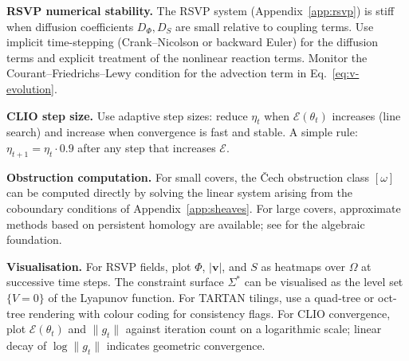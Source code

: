 \documentclass[11pt,openany]{book}
\begin{document}
\textbf{RSVP numerical stability.}  The RSVP system
(Appendix~\ref{app:rsvp}) is stiff when diffusion
coefficients $D_\Phi, D_S$ are small relative to coupling
terms.  Use implicit time-stepping (Crank--Nicolson or
backward Euler) for the diffusion terms and explicit
treatment of the nonlinear reaction terms.  Monitor the
Courant--Friedrichs--Lewy condition for the advection term
in Eq.~\eqref{eq:v-evolution}.

\textbf{CLIO step size.}  Use adaptive step sizes: reduce
$\eta_t$ when $\mathcal{E}(\theta_t)$ increases (line
search) and increase when convergence is fast and stable.
A simple rule: $\eta_{t+1} = \eta_t \cdot 0.9$ after any
step that increases $\mathcal{E}$.

\textbf{Obstruction computation.}  For small covers, the
Čech obstruction class $[\omega]$ can be computed directly
by solving the linear system arising from the coboundary
conditions of Appendix~\ref{app:sheaves}.  For large
covers, approximate methods based on persistent homology
are available; see \citet{bredon1997sheaf} for the
algebraic foundation.

\textbf{Visualisation.}  For RSVP fields, plot $\Phi$,
$|\boldsymbol{v}|$, and $S$ as heatmaps over $\Omega$ at
successive time steps.  The constraint surface $\Sigma^*$
can be visualised as the level set $\{V = 0\}$ of the
Lyapunov function.  For TARTAN tilings, use a quad-tree
or oct-tree rendering with colour coding for consistency
flags.  For CLIO convergence, plot $\mathcal{E}(\theta_t)$
and $\|g_t\|$ against iteration count on a logarithmic
scale; linear decay of $\log\|g_t\|$ indicates geometric
convergence.


\backmatter
\end{document}
